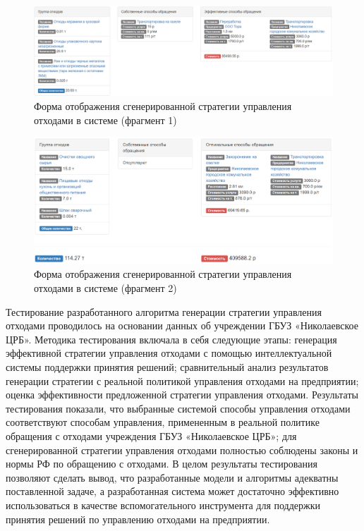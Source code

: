 \documentclass[a4paper]{G2-105}
\begin{document}
\begin{figure}[H]
\centering
\includegraphics[scale=0.5]{screen_strategy_4}
\caption{Форма отображения сгенерированной стратегии управления отходами в системе (фрагмент 1)}
\label{fig:screen_strategy_1}
\end{figure}

\begin{figure}[H]
\centering
\includegraphics[scale=0.5]{screen_strategy_3}
\caption{Форма отображения сгенерированной стратегии управления отходами в системе (фрагмент 2)}
\label{fig:screen_strategy_3}
\end{figure}

Тестирование разработанного алгоритма генерации стратегии управления отходами проводилось на основании данных об учреждении ГБУЗ «Николаевское ЦРБ». Методика тестирования включала в себя следующие этапы: генерация эффективной стратегии управления отходами с помощью интеллектуальной системы поддержки принятия решений; сравнительный анализ результатов генерации стратегии с реальной политикой управления отходами на предприятии; оценка эффективности предложенной стратегии управления отходами.
Результаты тестирования показали, что выбранные системой способы управления отходами соответствуют способам управления, примененным в реальной политике обращения с отходами учреждения ГБУЗ «Николаевское ЦРБ»; для сгенерированной стратегии управления отходами полностью соблюдены законы и нормы РФ по обращению с отходами.
В целом результаты тестирования позволяют сделать вывод, что разработанные модели и алгоритмы адекватны поставленной задаче, а разработанная система может достаточно эффективно использоваться в качестве вспомогательного инструмента для поддержки принятия решений по управлению отходами на предприятии. 
\end{document}

